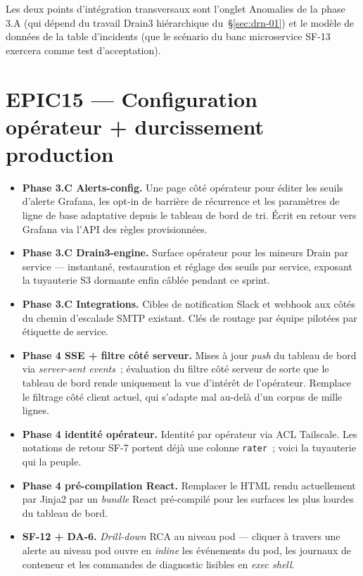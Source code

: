 \documentclass[11pt,a4paper,oneside]{report}
\begin{document}
Les deux points d'intégration transversaux sont l'onglet Anomalies
de la phase 3.A (qui dépend du travail Drain3 hiérarchique
du~\S\ref{sec:drn-01}) et le modèle de données de la table
d'incidents (que le scénario du banc microservice SF-13 exercera
comme test d'acceptation).

\section{EPIC15 --- Configuration opérateur + durcissement production}

\begin{itemize}
  \item \textbf{Phase 3.C Alerts-config.} Une page côté opérateur
        pour éditer les seuils d'alerte Grafana, les opt-in de
        barrière de récurrence et les paramètres de ligne de base
        adaptative depuis le tableau de bord de tri. Écrit en
        retour vers Grafana via l'API des règles provisionnées.
  \item \textbf{Phase 3.C Drain3-engine.} Surface opérateur pour
        les mineurs Drain par service --- instantané, restauration
        et réglage des seuils par service, exposant la tuyauterie
        S3 dormante enfin câblée pendant ce sprint.
  \item \textbf{Phase 3.C Integrations.} Cibles de notification
        Slack et webhook aux côtés du chemin d'escalade SMTP
        existant. Clés de routage par équipe pilotées par
        étiquette de service.
  \item \textbf{Phase 4 SSE + filtre côté serveur.} Mises à jour
        \emph{push} du tableau de bord via \emph{server-sent
        events}~; évaluation du filtre côté serveur de sorte que
        le tableau de bord rende uniquement la vue d'intérêt de
        l'opérateur. Remplace le filtrage côté client actuel, qui
        s'adapte mal au-delà d'un corpus de mille lignes.
  \item \textbf{Phase 4 identité opérateur.} Identité par
        opérateur via ACL Tailscale. Les notations de retour SF-7
        portent déjà une colonne \texttt{rater}~; voici la
        tuyauterie qui la peuple.
  \item \textbf{Phase 4 pré-compilation React.} Remplacer le HTML
        rendu actuellement par Jinja2 par un \emph{bundle} React
        pré-compilé pour les surfaces les plus lourdes du tableau
        de bord.
  \item \textbf{SF-12 + DA-6.} \emph{Drill-down} RCA au niveau
        pod --- cliquer à travers une alerte au niveau pod ouvre
        en \emph{inline} les événements du pod, les journaux de
        conteneur et les commandes de diagnostic lisibles en
        \emph{exec shell}.
\end{itemize}
\end{document}
